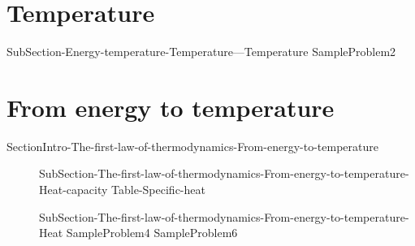 \documentclass[main.tex]{subfiles}
\begin{document}
\section{Temperature}{SubSection-Energy-temperature-Temperature---Temperature}
{SampleProblem2}
 

\section{From energy  to temperature}{SectionIntro-The-first-law-of-thermodynamics-From-energy-to-temperature}
\sloppy\begin{description}
\item[] {SubSection-The-first-law-of-thermodynamics-From-energy-to-temperature-Heat-capacity}
{Table-Specific-heat}
\item[] {SubSection-The-first-law-of-thermodynamics-From-energy-to-temperature-Heat}
{SampleProblem4}
{SampleProblem6}
\end{description}
\end{document}
